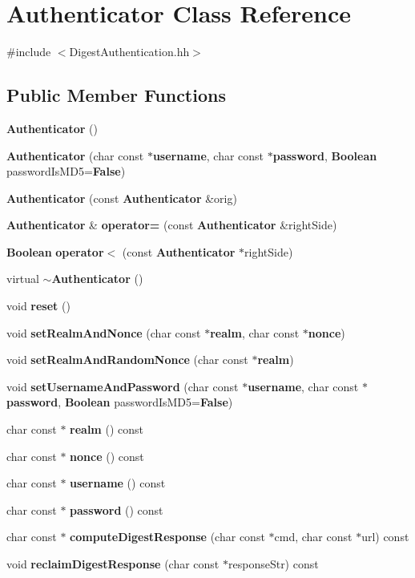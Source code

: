 \section{Authenticator Class Reference}
\label{classAuthenticator}


{\ttfamily \#include $<$Digest\+Authentication.\+hh$>$}

\subsection*{Public Member Functions}
\begin{DoxyCompactItemize}
\item 
{\bf Authenticator} ()
\item 
{\bf Authenticator} (char const $\ast${\bf username}, char const $\ast${\bf password}, {\bf Boolean} password\+Is\+M\+D5={\bf False})
\item 
{\bf Authenticator} (const {\bf Authenticator} \&orig)
\item 
{\bf Authenticator} \& {\bf operator=} (const {\bf Authenticator} \&right\+Side)
\item 
{\bf Boolean} {\bf operator$<$} (const {\bf Authenticator} $\ast$right\+Side)
\item 
virtual {\bf $\sim$\+Authenticator} ()
\item 
void {\bf reset} ()
\item 
void {\bf set\+Realm\+And\+Nonce} (char const $\ast${\bf realm}, char const $\ast${\bf nonce})
\item 
void {\bf set\+Realm\+And\+Random\+Nonce} (char const $\ast${\bf realm})
\item 
void {\bf set\+Username\+And\+Password} (char const $\ast${\bf username}, char const $\ast${\bf password}, {\bf Boolean} password\+Is\+M\+D5={\bf False})
\item 
char const $\ast$ {\bf realm} () const 
\item 
char const $\ast$ {\bf nonce} () const 
\item 
char const $\ast$ {\bf username} () const 
\item 
char const $\ast$ {\bf password} () const 
\item 
char const $\ast$ {\bf compute\+Digest\+Response} (char const $\ast$cmd, char const $\ast$url) const 
\item 
void {\bf reclaim\+Digest\+Response} (char const $\ast$response\+Str) const 
\end{DoxyCompactItemize}
